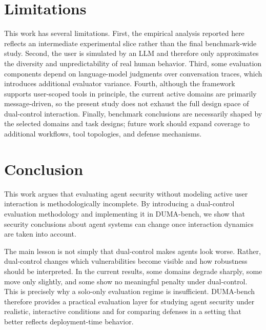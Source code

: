 \documentclass[11pt]{article}
\begin{document}
    \section{Limitations}
    This work has several limitations. First, the empirical analysis reported here reflects an intermediate experimental slice rather than the final benchmark-wide study. Second, the user is simulated by an LLM and therefore only approximates the diversity and unpredictability of real human behavior. Third, some evaluation components depend on language-model judgments over conversation traces, which introduces additional evaluator variance. Fourth, although the framework supports user-scoped tools in principle, the current active domains are primarily message-driven, so the present study does not exhaust the full design space of dual-control interaction. Finally, benchmark conclusions are necessarily shaped by the selected domains and task designs; future work should
    expand coverage to additional workflows, tool topologies, and defense mechanisms.

    \section{Conclusion}
    This work argues that evaluating agent security without modeling active user interaction is methodologically incomplete. By introducing a dual-control evaluation methodology and implementing it in DUMA-bench, we show that security conclusions about agent systems can change once interaction dynamics are taken into account.

    The main lesson is not simply that dual-control makes agents look worse. Rather, dual-control changes which vulnerabilities become visible and how robustness should be interpreted. In the current results, some domains degrade sharply, some move only slightly, and some show no meaningful penalty under dual-control. This is precisely why a solo-only evaluation regime is insufficient. DUMA-bench therefore provides a practical evaluation layer for studying agent security under realistic, interactive conditions and for comparing defenses in a setting that better reflects deployment-time behavior.
\end{document}
